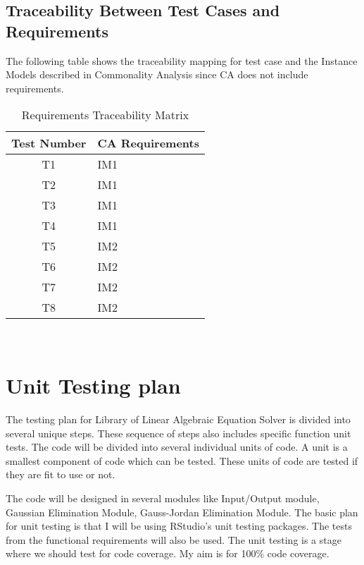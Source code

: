 \documentclass[12pt, titlepage]{article}
\begin{document}
\subsection{Traceability Between Test Cases and Requirements}

The following table shows the traceability mapping for test case and the
Instance Models described in Commonality Analysis since CA does not include
requirements.

\begin{table} [H]
  \caption{Requirements Traceability Matrix}
  \label{Table:Table_Traceability}  
\begin{tabular}{|c|p{8cm}|}
  \hline	
  \textbf{Test Number} & \textbf{CA Requirements}\\
  \hline 
   T1& IM1\\ \hline
   T2& IM1\\ \hline
   T3& IM1\\ \hline
   T4& IM1\\ \hline
   T5& IM2\\ \hline
   T6& IM2\\ \hline
   T7& IM2\\ \hline
   T8& IM2\\ \hline
   
  

\end{tabular}\\
\end{table}

\section{Unit Testing plan}



The testing plan for Library of Linear Algebraic Equation Solver is divided into
several unique steps. These sequence of steps also includes specific function
unit tests. The code will be divided into several individual units of code. A
unit is a smallest component of code which can be tested. These units of code
are tested if they are fit to use or not.

The code will be designed in several modules like Input/Output module, Gaussian
Elimination Module, Gauss-Jordan Elimination Module. The basic plan for unit
testing is that I will be using RStudio's unit testing packages. The tests from
the functional requirements will also be used. The unit testing is a stage where
we should test for code coverage. My aim is for 100\% code coverage.
\end{document}
